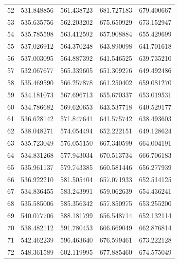 \begin{table}
\begin{tabular}{rrrrr}
52 & 531.848856 & 561.438723 & 681.727183 & 679.400667 \\
53 & 535.635756 & 562.203202 & 675.650929 & 673.152947 \\
54 & 535.785598 & 563.412592 & 657.908884 & 655.429699 \\
55 & 537.026912 & 564.370248 & 643.890098 & 641.701618 \\
56 & 537.003095 & 564.887392 & 641.546525 & 639.735210 \\
57 & 532.067677 & 565.339605 & 651.309276 & 649.492486 \\
58 & 535.469590 & 566.257878 & 661.250402 & 659.081270 \\
59 & 534.181073 & 567.696713 & 655.670337 & 653.019531 \\
60 & 534.786682 & 569.620653 & 643.537718 & 640.529177 \\
61 & 536.628142 & 571.847641 & 641.575742 & 638.493603 \\
62 & 538.048271 & 574.054494 & 652.222151 & 649.128624 \\
63 & 535.723049 & 576.055150 & 667.340599 & 664.004191 \\
64 & 534.831268 & 577.943034 & 670.513734 & 666.706183 \\
65 & 535.961137 & 579.743385 & 660.581446 & 656.277939 \\
66 & 536.922210 & 581.505404 & 657.071933 & 652.514125 \\
67 & 534.836455 & 583.243991 & 659.062639 & 654.436241 \\
68 & 535.585006 & 585.356342 & 657.850975 & 653.255200 \\
69 & 540.077706 & 588.181799 & 656.548714 & 652.132114 \\
70 & 538.482112 & 591.780453 & 666.669049 & 662.876814 \\
71 & 542.462239 & 596.463640 & 676.599461 & 673.222128 \\
72 & 548.361589 & 602.119995 & 677.885460 & 674.575049 \\
\bottomrule
\end{tabular}
\end{table}
